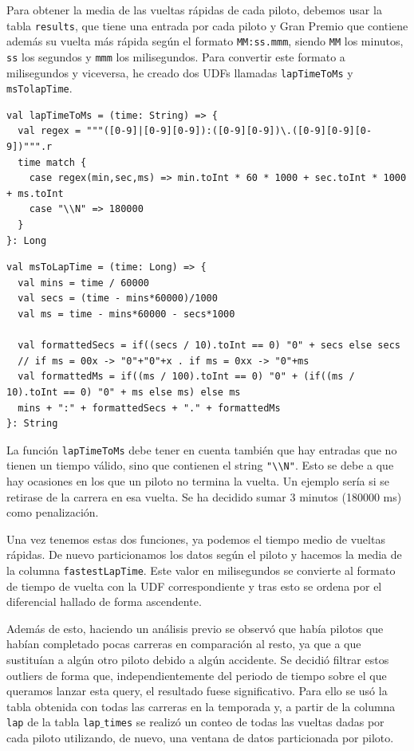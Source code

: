 \documentclass[12pt,twoside,titlepage]{report}
\begin{document}
Para obtener la media de las vueltas rápidas de cada piloto, debemos usar la tabla \texttt{results}, que tiene una entrada por cada piloto y Gran Premio que contiene además su vuelta más rápida según el formato \texttt{MM:ss.mmm}, siendo \texttt{MM} los minutos, \texttt{ss} los segundos y \texttt{mmm} los milisegundos. Para convertir este formato a milisegundos y viceversa, he creado dos UDFs llamadas \texttt{lapTimeToMs} y \texttt{msTolapTime}.

\vfil \break

\begin{lstlisting}
val lapTimeToMs = (time: String) => {
  val regex = """([0-9]|[0-9][0-9]):([0-9][0-9])\.([0-9][0-9][0-9])""".r
  time match {
    case regex(min,sec,ms) => min.toInt * 60 * 1000 + sec.toInt * 1000 + ms.toInt
    case "\\N" => 180000
  }  
}: Long
  \end{lstlisting}

\begin{lstlisting}
val msToLapTime = (time: Long) => {
  val mins = time / 60000
  val secs = (time - mins*60000)/1000
  val ms = time - mins*60000 - secs*1000
    
  val formattedSecs = if((secs / 10).toInt == 0) "0" + secs else secs
  // if ms = 00x -> "0"+"0"+x . if ms = 0xx -> "0"+ms
  val formattedMs = if((ms / 100).toInt == 0) "0" + (if((ms / 10).toInt == 0) "0" + ms else ms) else ms
  mins + ":" + formattedSecs + "." + formattedMs    
}: String
\end{lstlisting}

La función \texttt{lapTimeToMs} debe tener en cuenta también que hay entradas que no tienen un tiempo válido, sino que contienen el string \texttt{"\textbackslash\textbackslash N"}. Esto se debe a que hay ocasiones en los que un piloto no termina la vuelta. Un ejemplo sería si se retirase de la carrera en esa vuelta. Se ha decidido sumar 3 minutos (180000 ms) como penalización.

Una vez tenemos estas dos funciones, ya podemos el tiempo medio de vueltas rápidas. De nuevo particionamos los datos según el piloto y hacemos la media de la columna \texttt{fastestLapTime}. Este valor en milisegundos se convierte al formato de tiempo de vuelta con la UDF correspondiente y tras esto se ordena por el diferencial hallado de forma ascendente.

Además de esto, haciendo un análisis previo se observó que había pilotos que habían completado pocas carreras en comparación al resto, ya que a que sustituían a algún otro piloto debido a algún accidente. Se decidió filtrar estos outliers de forma que, independientemente del periodo de tiempo sobre el que queramos lanzar esta query, el resultado fuese significativo. Para ello se usó la tabla obtenida con todas las carreras en la temporada y, a partir de la columna \texttt{lap} de la tabla \texttt{lap$\_$times} se realizó un conteo de todas las vueltas dadas por cada piloto utilizando, de nuevo, una ventana de datos particionada por piloto.
\end{document}
